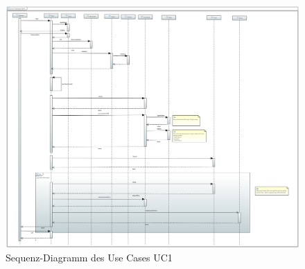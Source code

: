 \begin{figure}[H]
    \centering
    \includegraphics[angle=90,width=1.0\textwidth]{img/sequence_diagram_uc1.PNG}
    \caption{Sequenz-Diagramm des Use Cases
        UC1}\label{fig:sequence-diagrams:uc1}
\end{figure}
